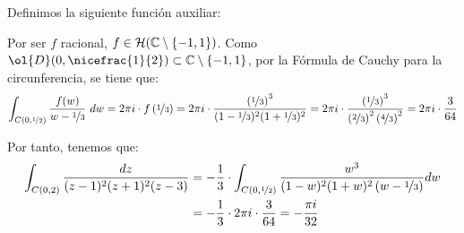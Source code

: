 \begin{ejercicio}
\begin{enumerate}
        Definimos la siguiente función auxiliar:

        Por ser $f$ racional, $f\in \mathcal{H}(\mathbb{C}\setminus \{-1,1\})$. Como $\ol{D}(0,\nicefrac{1}{2})\subset \bb{C}\setminus \{-1,1\}$, por la Fórmula de Cauchy para la circunferencia, se tiene que:
        \begin{equation*}
            \int_{C(0,\nicefrac{1}{2})} \dfrac{f(w)}{w-\nicefrac{1}{3}}\ dw = 2\pi i\cdot f\left(\nicefrac{1}{3}\right) = 2\pi i \cdot \dfrac{\left(\nicefrac{1}{3}\right)^3}{(1-\nicefrac{1}{3})^2(1+\nicefrac{1}{3})^2} = 2\pi i \cdot \dfrac{\left(\nicefrac{1}{3}\right)^3}{\left(\nicefrac{2}{3}\right)^2\left(\nicefrac{4}{3}\right)^2} = 2\pi i \cdot \dfrac{3}{64}
        \end{equation*}

        Por tanto, tenemos que:
        \begin{align*}
            \int_{C(0,2)} \frac{dz}{(z-1)^2(z+1)^2(z-3)} &= -\dfrac{1}{3}\cdot \int_{C(0,\nicefrac{1}{2})}\frac{w^3}{(1-w)^2(1+w)^2\left(w-\nicefrac{1}{3}\right)} dw\\
            &= -\dfrac{1}{3}\cdot 2\pi i \cdot \dfrac{3}{64} = -\dfrac{\pi i}{32}
        \end{align*}
    \end{enumerate}
\end{ejercicio}
